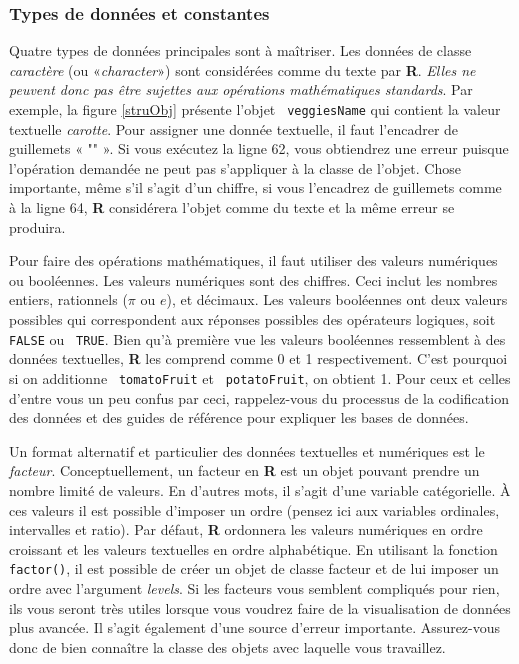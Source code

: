 \documentclass[10.5pt,a4paper]{article}
\newcommand{\rcode}[1]{\texttt{\color{rstudio} #1}}
\begin{document}
    \subsubsection{Types de données et constantes}
    Quatre types de données principales sont à maîtriser. Les données de classe \emph{caractère} (ou «\emph{character}») sont considérées comme du texte par \textbf{R}. \emph{Elles ne peuvent donc pas être sujettes aux opérations mathématiques standards}. Par exemple, la figure \ref{struObj} présente l'objet \rcode{veggiesName} qui contient la valeur textuelle \emph{carotte}. Pour assigner une donnée textuelle, il faut l'encadrer de guillemets « "" ». Si vous exécutez la ligne 62, vous obtiendrez une erreur puisque l'opération demandée ne peut pas s'appliquer à la classe de l'objet. Chose importante, même s'il s'agit d'un chiffre, si vous l'encadrez de guillemets comme à la ligne 64, \textbf{R} considérera l'objet comme du texte et la même erreur se produira. 
    
    Pour faire des opérations mathématiques, il faut utiliser des valeurs numériques ou booléennes. Les valeurs numériques sont des chiffres. Ceci inclut les nombres entiers, rationnels ($\pi$ ou $e$), et décimaux. Les valeurs booléennes ont deux valeurs possibles qui correspondent aux réponses possibles des opérateurs logiques, soit \rcode{FALSE} ou \rcode{TRUE}. Bien qu'à première vue les valeurs booléennes ressemblent à des données textuelles, \textbf{R} les comprend comme 0 et 1 respectivement. C'est pourquoi si on additionne \rcode{tomatoFruit} et \rcode{potatoFruit}, on obtient 1. Pour ceux et celles d'entre vous un peu confus par ceci, rappelez-vous du processus de la codification des données et des guides de référence pour expliquer les bases de données.
    
    Un format alternatif et particulier des données textuelles et numériques est le \emph{facteur}. Conceptuellement, un facteur en \textbf{R} est un objet pouvant prendre un nombre limité de valeurs. En d'autres mots, il s'agit d'une variable catégorielle. À ces valeurs il est possible d'imposer un ordre (pensez ici aux variables ordinales, intervalles et ratio). Par défaut, \textbf{R} ordonnera les valeurs numériques en ordre croissant et les valeurs textuelles en ordre alphabétique. En utilisant la fonction \rcode{factor()}, il est possible de créer un objet de classe facteur et de lui imposer un ordre avec l'argument \emph{levels}. Si les facteurs vous semblent compliqués pour rien, ils vous seront très utiles lorsque vous voudrez faire de la visualisation de données plus avancée. Il s'agit également d'une source d'erreur importante. Assurez-vous donc de bien connaître la classe des objets avec laquelle vous travaillez.
    
\end{document}
